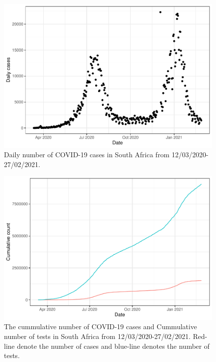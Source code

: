 \documentclass[10pt,letterpaper]{article}
\begin{document}
\begin{figure}[H]
\includegraphics[width=0.99\linewidth]{COVIDincidenceSA_files/figure-latex/daily-cases-1} \caption{Daily number of COVID-19 cases in South Africa from 12/03/2020-27/02/2021.}\label{fig:daily-cases}
\end{figure}

\begin{figure}[H]
\includegraphics[width=0.99\linewidth]{COVIDincidenceSA_files/figure-latex/cummulative-1} \caption{The cummulative number of COVID-19 cases and Cummulative number of tests in South Africa from 12/03/2020-27/02/2021. Red-line denote the number of cases and blue-line denotes the number of tests.}\label{fig:cummulative}
\end{figure}
\end{document}
